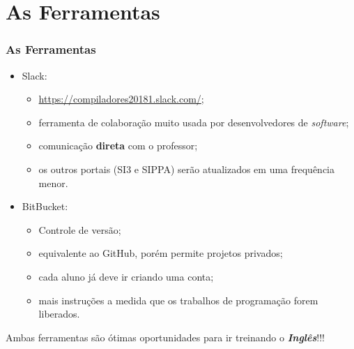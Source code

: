\documentclass[table]{beamer}
\begin{document}
\section{As Ferramentas}
\begin{frame}
   \frametitle{As Ferramentas}
   \begin{itemize}
      \item Slack:
      \begin{itemize}
         \item \url{https://compiladores20181.slack.com/};
	 \item ferramenta de colaboração muito usada por desenvolvedores de \textit{software};
	 \item comunicação \textbf{direta} com o professor;
	 \item os outros portais (SI3 e SIPPA) serão atualizados em uma frequência menor.
      \end{itemize}
      \item BitBucket:
      \begin{itemize}
         \item Controle de versão;
	 \item equivalente ao GitHub, porém permite projetos privados;
	 \item cada aluno já deve ir criando uma conta;
	 \item mais instruções a medida que os trabalhos de programação forem liberados.
      \end{itemize}
   \end{itemize}
   \begin{center}
   Ambas ferramentas são ótimas oportunidades para ir treinando o \textit{\textbf{Inglês}}!!!
   \end{center}
\end{frame}
\end{document}
